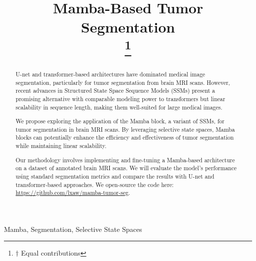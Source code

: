 \documentclass[conference]{IEEEtran}
\begin{document}
\title{Mamba-Based Tumor Segmentation\\
    \thanks{$\dagger$ Equal contributions}
}

\author{
    \and
}

\maketitle

\begin{abstract}
    U-net and transformer-based architectures have dominated medical image segmentation, particularly for tumor segmentation from brain MRI scans. However, recent advances in Structured State Space Sequence Models (SSMs) present a promising alternative with comparable modeling power to transformers but linear scalability in sequence length, making them well-suited for large medical images.

    We propose exploring the application of the Mamba block, a variant of SSMs, for tumor segmentation in brain MRI scans. By leveraging selective state spaces, Mamba blocks can potentially enhance the efficiency and effectiveness of tumor segmentation while maintaining linear scalability.

    Our methodology involves implementing and fine-tuning a Mamba-based architecture on a dataset of annotated brain MRI scans. We will evaluate the model's performance using standard segmentation metrics and compare the results with U-net and transformer-based approaches. We open-source the code here: \href{https://github.com/lxaw/mamba-tumor-seg}{https://github.com/lxaw/mamba-tumor-seg}.
\end{abstract}

\begin{IEEEkeywords}
    Mamba, Segmentation, Selective State Spaces
\end{IEEEkeywords}
\end{document}
